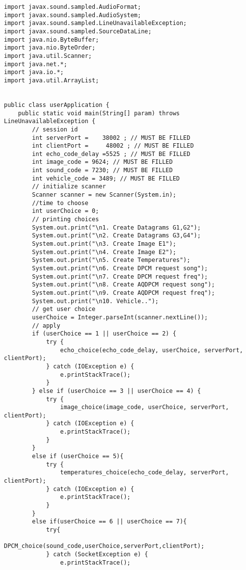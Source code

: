 \documentclass{article}
\begin{document}
\begin{lstlisting}
import javax.sound.sampled.AudioFormat;
import javax.sound.sampled.AudioSystem;
import javax.sound.sampled.LineUnavailableException;
import javax.sound.sampled.SourceDataLine;
import java.nio.ByteBuffer;
import java.nio.ByteOrder;
import java.util.Scanner;
import java.net.*;
import java.io.*;
import java.util.ArrayList;


public class userApplication {
    public static void main(String[] param) throws LineUnavailableException {
        // session id
        int serverPort =    38002 ; // MUST BE FILLED
        int clientPort =     48002 ; // MUST BE FILLED
        int echo_code_delay =5525 ; // MUST BE FILLED
        int image_code = 9624; // MUST BE FILLED
        int sound_code = 7230; // MUST BE FILLED
        int vehicle_code = 3489; // MUST BE FILLED
        // initialize scanner
        Scanner scanner = new Scanner(System.in);
        //time to choose
        int userChoice = 0;
        // printing choices
        System.out.print("\n1. Create Datagrams G1,G2");
        System.out.print("\n2. Create Datagrams G3,G4");
        System.out.print("\n3. Create Image E1");
        System.out.print("\n4. Create Image E2");
        System.out.print("\n5. Create Temperatures");
        System.out.print("\n6. Create DPCM request song");
        System.out.print("\n7. Create DPCM request freq");
        System.out.print("\n8. Create AQDPCM request song");
        System.out.print("\n9. Create AQDPCM request freq");
        System.out.print("\n10. Vehicle..");
        // get user choice
        userChoice = Integer.parseInt(scanner.nextLine());
        // apply
        if (userChoice == 1 || userChoice == 2) {
            try {
                echo_choice(echo_code_delay, userChoice, serverPort, clientPort);
            } catch (IOException e) {
                e.printStackTrace();
            }
        } else if (userChoice == 3 || userChoice == 4) {
            try {
                image_choice(image_code, userChoice, serverPort, clientPort);
            } catch (IOException e) {
                e.printStackTrace();
            }
        }
        else if (userChoice == 5){
            try {
                temperatures_choice(echo_code_delay, serverPort, clientPort);
            } catch (IOException e) {
                e.printStackTrace();
            }
        }
        else if(userChoice == 6 || userChoice == 7){
            try{
                DPCM_choice(sound_code,userChoice,serverPort,clientPort);
            } catch (SocketException e) {
                e.printStackTrace();

\end{lstlisting}
\end{document}

